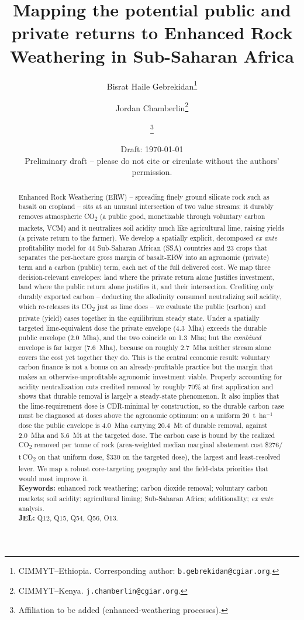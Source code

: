 \documentclass[12pt]{article}
\title{\textbf{Mapping the potential public and private returns to
Enhanced Rock Weathering in Sub-Saharan Africa}}
\author{
  Bisrat Haile Gebrekidan\thanks{CIMMYT--Ethiopia. Corresponding author: \texttt{b.gebrekidan@cgiar.org}.} \and
  Jordan Chamberlin\thanks{CIMMYT--Kenya. \texttt{j.chamberlin@cgiar.org}.} \and
  \todo{Author Three}\thanks{Affiliation to be added (enhanced-weathering processes).}
}
\date{Draft: \today\\[3pt]
  {\small\color{red!75!black}Preliminary draft -- please do not cite or
  circulate without the authors' permission.}}
\newcommand{\tco}{\,t\,CO\textsubscript{2}}
\newcommand{\co}{CO\textsubscript{2}}
\begin{document}
\maketitle

\begin{abstract}
\noindent
Enhanced Rock Weathering (ERW) -- spreading finely ground silicate rock such as
basalt on cropland -- sits at an unusual intersection of two value streams: it
durably removes atmospheric \co{} (a public good, monetizable through voluntary
carbon markets, VCM) and it neutralizes soil acidity much like agricultural
lime, raising yields (a private return to the farmer). We develop a spatially
explicit, decomposed \emph{ex ante} profitability model for 44 Sub-Saharan African
(SSA) countries and 23 crops that separates the per-hectare gross margin of
basalt-ERW into an agronomic (private) term and a carbon (public) term, each
net of the full delivered cost. We map three decision-relevant envelopes: land
where the private return alone justifies investment, land where the public
return alone justifies it, and their intersection. Crediting only durably exported carbon -- deducting the alkalinity consumed
neutralizing soil acidity, which re-releases its \co{} just as lime does -- we
evaluate the public (carbon) and private (yield) cases together in the
equilibrium steady state. Under a spatially targeted lime-equivalent dose the
private envelope (4.3~Mha) exceeds the durable public envelope (2.0~Mha), and the
two coincide on 1.3~Mha; but the \emph{combined} envelope is far larger
(7.6~Mha), because on roughly 2.7~Mha neither stream alone covers the cost yet
together they do. This is the central economic result: voluntary carbon finance
is not a bonus on an already-profitable practice but the margin that makes an
otherwise-unprofitable agronomic investment viable. Properly accounting for
acidity neutralization cuts credited removal by roughly 70\% at first application
and shows that durable removal is largely a steady-state phenomenon. It also
implies that the lime-requirement dose is CDR-minimal by construction, so the
durable carbon case must be diagnosed at doses above the agronomic optimum: on a
uniform 20~t~ha$^{-1}$ dose the public envelope is 4.0~Mha carrying 20.4~Mt of
durable removal, against 2.0~Mha and 5.6~Mt at the targeted dose. The carbon case
is bound by the realized \co{} removed per tonne of rock (area-weighted median
marginal abatement cost \$276/\tco{} on that uniform dose, \$330 on the targeted
dose), the largest and least-resolved lever. We map a robust core-targeting
geography and the field-data priorities that would most improve it.
\\[4pt]
\textbf{Keywords:} enhanced rock weathering; carbon dioxide removal; voluntary
carbon markets; soil acidity; agricultural liming; Sub-Saharan Africa;
additionality; \emph{ex ante} analysis. \\
\textbf{JEL:} Q12, Q15, Q54, Q56, O13.
\end{abstract}
\end{document}
